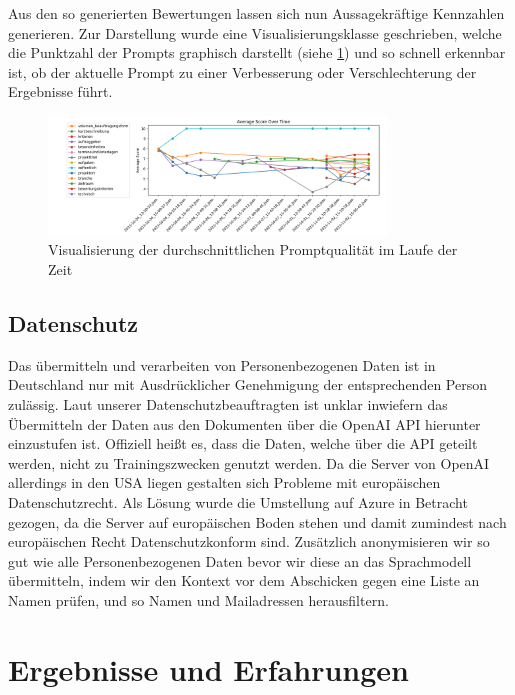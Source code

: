 Aus den so generierten Bewertungen lassen sich nun Aussagekräftige Kennzahlen 
generieren. Zur Darstellung wurde eine Visualisierungsklasse geschrieben, welche die Punktzahl der Prompts graphisch darstellt 
(siehe \ref{fig:03_Prompt_Evaluierung}) und so schnell erkennbar ist, ob der aktuelle Prompt zu einer Verbesserung 
oder Verschlechterung der Ergebnisse führt.

\begin{figure}[H]
    \centering
    \includegraphics[width=0.8\textwidth]{figures/03_Prompt_Evaluierung.png}
    \caption{Visualisierung der durchschnittlichen Promptqualität im Laufe der Zeit}
    \label{fig:03_Prompt_Evaluierung}    %
    \end{figure}

\subsection{Datenschutz}
Das übermitteln und verarbeiten von Personenbezogenen Daten ist in Deutschland nur mit Ausdrücklicher Genehmigung der
entsprechenden Person zulässig. Laut unserer Datenschutzbeauftragten ist unklar inwiefern das Übermitteln der Daten aus
den Dokumenten über die OpenAI API hierunter einzustufen ist. Offiziell heißt es, dass die Daten, welche über die API
geteilt werden, nicht zu Trainingszwecken genutzt werden. Da die Server von OpenAI allerdings in den USA liegen
gestalten sich Probleme mit europäischen Datenschutzrecht. Als Lösung wurde die Umstellung auf Azure in Betracht
gezogen, da die Server auf europäischen Boden stehen und damit zumindest nach europäischen Recht Datenschutzkonform
sind. Zusätzlich anonymisieren wir so gut wie alle Personenbezogenen Daten bevor wir diese an das Sprachmodell
übermitteln, indem wir den Kontext vor dem Abschicken gegen eine Liste an Namen prüfen, und so Namen und Mailadressen
herausfiltern.

\section{Ergebnisse und Erfahrungen}

